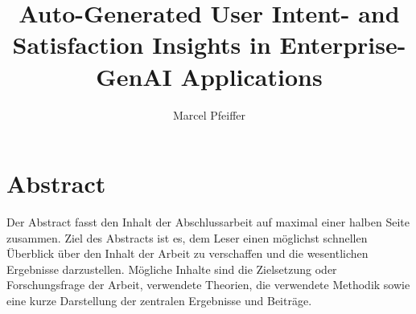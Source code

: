 \documentclass[
	ngerman,
	ruledheaders=section,%
	class=report,%
	thesis={type=bachelor},%
	accentcolor=1b,%
	custommargins=true,%
	marginpar=false,%
	parskip=half-,%
	fontsize=11pt,%
	DIV=14,
]{tudapub}
\begin{document}


\title{Auto-Generated User Intent- and Satisfaction Insights in Enterprise-GenAI Applications}

\author[M. Pfeiffer]{Marcel Pfeiffer}%


\submissiondate{\today}
\examdate{\today}


\maketitle

\affidavit


\chapter*{Abstract}
Der Abstract fasst den Inhalt der Abschlussarbeit auf maximal einer halben Seite zusammen. Ziel des Abstracts ist es, dem Leser einen möglichst schnellen Überblick über den Inhalt der Arbeit zu verschaffen und die wesentlichen Ergebnisse darzustellen. Mögliche Inhalte sind die Zielsetzung oder Forschungsfrage der Arbeit, verwendete Theorien, die verwendete Methodik sowie eine kurze Darstellung der zentralen Ergebnisse und Beiträge.

\tableofcontents



\end{document}

